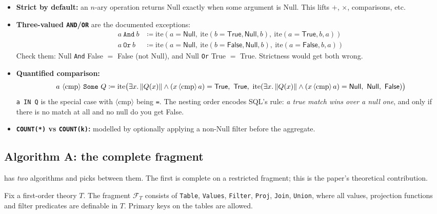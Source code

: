 \begin{itemize}
\item \textbf{Strict by default:} an $n$-ary operation returns \textsf{Null} exactly when
      some argument is \textsf{Null}. This lifts $+$, $\times$, comparisons, etc.
\item \textbf{Three-valued \texttt{AND}/\texttt{OR}} are the documented exceptions:
\begin{align*}
a\ \texttt{And}\ b &\coloneqq \mathrm{ite}(a=\textsf{Null},\ \mathrm{ite}(b=\textsf{True},\textsf{Null},b),\ \mathrm{ite}(a=\textsf{True},b,a))\\
a\ \texttt{Or}\ b &\coloneqq \mathrm{ite}(a=\textsf{Null},\ \mathrm{ite}(b=\textsf{False},\textsf{Null},b),\ \mathrm{ite}(a=\textsf{False},b,a))
\end{align*}
      Check them: \textsf{Null} \texttt{And} \textsf{False} $=$ \textsf{False} (not
      \textsf{Null}), and \textsf{Null} \texttt{Or} \textsf{True} $=$ \textsf{True}.
      Strictness would get both wrong.
\item \textbf{Quantified comparison:}
\[
a\ \langle\mathrm{cmp}\rangle\ \texttt{Some}\ Q \coloneqq
\mathrm{ite}\bigl(\exists x.\sq{Q(x)}\wedge (x\,\langle\mathrm{cmp}\rangle\,a)=\textsf{True},\ \textsf{True},\
\mathrm{ite}(\exists x.\sq{Q(x)}\wedge(x\,\langle\mathrm{cmp}\rangle\,a)=\textsf{Null},\ \textsf{Null},\ \textsf{False})\bigr)
\]
      \lstinline|a IN Q| is the special case with $\langle\mathrm{cmp}\rangle$ being
      \texttt{=}. The nesting order encodes SQL's rule: \emph{a true match wins over a
      null one}, and only if there is no match at all and no null do you get
      \textsf{False}.
\item \textbf{\lstinline|COUNT(*)| vs \lstinline|COUNT(k)|:} modelled by optionally applying
      a non-\textsf{Null} filter before the aggregate.
\end{itemize}

\subsection{Algorithm A: the complete fragment}
\label{sec:qed-complete}

\QED{} has \emph{two} algorithms and picks between them. The first is complete on a
restricted fragment; this is the paper's theoretical contribution.

\begin{definition}
Fix a first-order theory $T$. The fragment $\mathcal F_T$ consists of
\texttt{Table}, \texttt{Values}, \texttt{Filter}, \texttt{Proj}, \texttt{Join},
\texttt{Union}, where all values, projection functions and filter predicates are definable
in $T$. Primary keys on the tables are allowed.
\end{definition}

